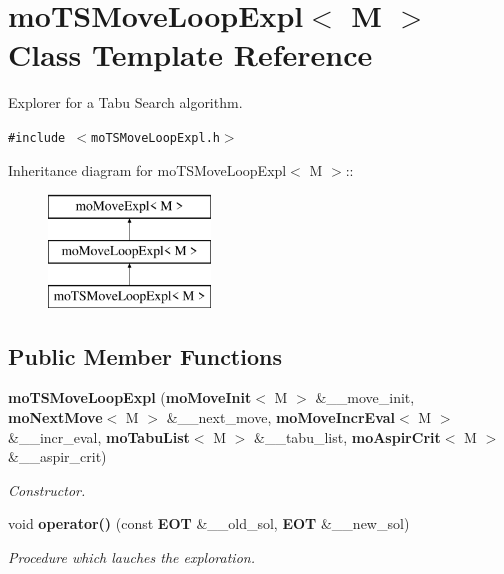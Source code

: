 \section{mo\-TSMove\-Loop\-Expl$<$ M $>$ Class Template Reference}
\label{classmo_t_s_move_loop_expl}
Explorer for a Tabu Search algorithm.  


{\tt \#include $<$mo\-TSMove\-Loop\-Expl.h$>$}

Inheritance diagram for mo\-TSMove\-Loop\-Expl$<$ M $>$::\begin{figure}[H]
\begin{center}
\leavevmode
\includegraphics[height=3cm]{classmo_t_s_move_loop_expl}
\end{center}
\end{figure}
\subsection*{Public Member Functions}
\begin{CompactItemize}
\item 
{\bf mo\-TSMove\-Loop\-Expl} ({\bf mo\-Move\-Init}$<$ M $>$ \&\_\-\_\-move\_\-init, {\bf mo\-Next\-Move}$<$ M $>$ \&\_\-\_\-next\_\-move, {\bf mo\-Move\-Incr\-Eval}$<$ M $>$ \&\_\-\_\-incr\_\-eval, {\bf mo\-Tabu\-List}$<$ M $>$ \&\_\-\_\-tabu\_\-list, {\bf mo\-Aspir\-Crit}$<$ M $>$ \&\_\-\_\-aspir\_\-crit)
\begin{CompactList}\small\item\em Constructor. \item\end{CompactList}\item 
void {\bf operator()} (const {\bf EOT} \&\_\-\_\-old\_\-sol, {\bf EOT} \&\_\-\_\-new\_\-sol)
\begin{CompactList}\small\item\em Procedure which lauches the exploration. \item\end{CompactList}\end{CompactItemize}
